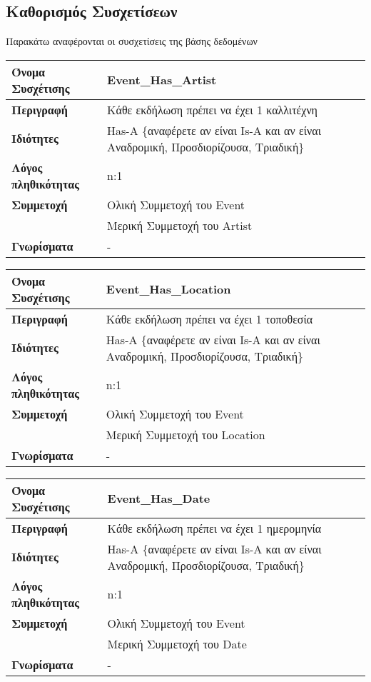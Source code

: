 \subsection{Καθορισμός Συσχετίσεων}

Παρακάτω αναφέρονται οι συσχετίσεις της βάσης δεδομένων \titlos

\begin{tabular}[]{|p{4cm}|p{10cm}|}
  \hline
  \textbf{Όνομα Συσχέτισης} & Event\_Has\_Artist\\ \hline
  \textbf{Περιγραφή} & Κάθε εκδήλωση πρέπει να έχει 1 καλλιτέχνη\\ \hline
  \textbf{Ιδιότητες} & Has-A \{αναφέρετε αν είναι Is-A και αν είναι
                       Αναδρομική, Προσδιορίζουσα, Τριαδική\} \\ \hline
  \textbf{Λόγος πληθικότητας} & n:1 \\ \hline
  \textbf{Συμμετοχή} & Ολική Συμμετοχή του Event \\ \cline{2-2}
                     & Μερική Συμμετοχή του Artist \\ \hline
  \textbf{Γνωρίσματα} & - \\ \hline
\end{tabular}


\begin{tabular}[]{|p{4cm}|p{10cm}|}
  \hline
  \textbf{Όνομα Συσχέτισης} & Event\_Has\_Location\\ \hline
  \textbf{Περιγραφή} & Κάθε εκδήλωση πρέπει να έχει 1 τοποθεσία\\ \hline
  \textbf{Ιδιότητες} & Has-A \{αναφέρετε αν είναι Is-A και αν είναι
                       Αναδρομική, Προσδιορίζουσα, Τριαδική\} \\ \hline
  \textbf{Λόγος πληθικότητας} & n:1 \\ \hline
  \textbf{Συμμετοχή} & Ολική Συμμετοχή του Event \\ \cline{2-2}
                     & Μερική Συμμετοχή του Location \\ \hline
  \textbf{Γνωρίσματα} & - \\ \hline
\end{tabular}


\begin{tabular}[]{|p{4cm}|p{10cm}|}
  \hline
  \textbf{Όνομα Συσχέτισης} & Event\_Has\_Date\\ \hline
  \textbf{Περιγραφή} & Κάθε εκδήλωση πρέπει να έχει 1 ημερομηνία\\ \hline
  \textbf{Ιδιότητες} & Has-A \{αναφέρετε αν είναι Is-A και αν είναι
                       Αναδρομική, Προσδιορίζουσα, Τριαδική\} \\ \hline
  \textbf{Λόγος πληθικότητας} & n:1 \\ \hline
  \textbf{Συμμετοχή} & Ολική Συμμετοχή του Event \\ \cline{2-2}
                     & Μερική Συμμετοχή του Date \\ \hline
  \textbf{Γνωρίσματα} & - \\ \hline
\end{tabular}


